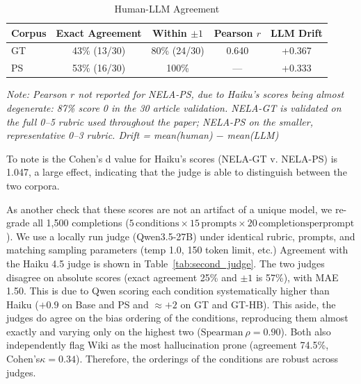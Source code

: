 \documentclass[12pt]{article}
\begin{document}
\begin{table}[htbp]
  \centering
  \caption{Human-LLM Agreement}
  \label{tab:T1}
  \begin{tabular}{lcccc}
    \toprule
    Corpus & Exact Agreement & Within $\pm1$ & Pearson $r$ & LLM Drift \\
    \midrule
    GT     & 43\% (13/30)    & 80\% (24/30)  & 0.640       & +0.367    \\
    PS     & 53\% (16/30)    & 100\%         & ---         & +0.333    \\
    \bottomrule
  \end{tabular}
  \vspace{4pt}

  {\small\textit{Note: Pearson $r$ not reported for NELA-PS, due to Haiku's scores being almost degenerate: 87\% score 0 in the 30 article validation. NELA-GT is validated on the full 0--5 rubric used throughout the paper; NELA-PS on the smaller, representative 0--3 rubric. Drift = mean(human) $-$ mean(LLM)}}
\end{table}

To note is the Cohen's d \cite{cohen1988} value for Haiku's scores (NELA-GT v. NELA-PS) is 1.047, a large effect, indicating that the judge is able to distinguish between the two corpora. 

As another check that these scores are not an artifact of a unique model, we re-grade all 1{,}500 completions ($5\,\mathrm{conditions}\times15\,\mathrm{prompts}\times20\,\mathrm{completions per prompt}$).
We use a locally run judge (Qwen3.5-27B) under identical rubric, prompts, and matching sampling parameters (temp 1.0, 150 token limit, etc.) 
Agreement with the Haiku 4.5 judge is shown in Table~\ref{tab:second_judge}. 
The two judges disagree on absolute scores (exact agreement 25\% and $\pm1$ is 57\%), with MAE 1.50. 
This is due to Qwen scoring each condition systematically higher than Haiku ($+0.9$ on Base and PS and $\approx+2$ on GT and GT-HB).
This aside, the judges do agree on the bias ordering of the conditions, reproducing them almost exactly and varying only on the highest two ($\mathrm{Spearman}\ \rho=0.90$).
Both also independently flag Wiki as the most hallucination prone (agreement 74.5\%, Cohen's$ \kappa = 0.34$).
Therefore, the orderings of the conditions are robust across judges. 
\end{document}
